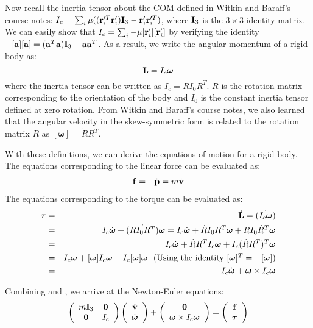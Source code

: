 Now recall the inertia tensor about the COM defined in Witkin and
Baraff's course notes: $I_c = \sum_i \mathbf{\mu} ((\mathbf{r}_i'^T
\mathbf{r}_i')\mathbf{I}_3 - \mathbf{r}_i' \mathbf{r}_i'^T)$, where $\mathbf{I}_3$ is the $3\times 3$
identity matrix. We can easily show that
$I_c = \sum_i -\mathbf{\mu} [\mathbf{r}_i'][\mathbf{r}_i']$ by verifying the
identity $-[\mathbf{a}][\mathbf{a}] = (\mathbf{a}^T\mathbf{a}) \mathbf{I}_3  -
\mathbf{a}\mathbf{a}^T$. As a result, we write the angular momentum of a rigid body as:
\begin{equation}
\mathbf{L} = I_c \bm{\omega}
\end{equation}
where the inertia tensor can be written as $I_c = RI_0R^T$. $R$ is the rotation matrix corresponding to the orientation of the body and $I_0$ is the constant inertia tensor defined at zero rotation. From Witkin and Baraff's course notes, we also learned that the angular velocity in the skew-symmetric form is related to the rotation matrix $R$ as $[\bm{\omega}] = \dot{R}R^T$.

With these definitions, we can derive the equations of motion for a
rigid body. The equations corresponding to the linear force can be evaluated as:
\begin{eqnarray}
\label{eq:force}
\mathbf{f} & = & \dot{\mathbf{p}} = m \dot{\mathbf{v}}
\end{eqnarray}
The equations corresponding to the torque can be evaluated as:
\begin{eqnarray}
\label{eq:torque}
\nonumber
\bm{\tau} & = & \dot{\mathbf{L}} = \dot{(I_c \bm{\omega})} \\
\nonumber
& = & I_c\dot{\bm{\omega}} + \dot{(RI_0 R^T)}\bm{\omega} = I_c\dot{\bm{\omega}} + \dot{R}I_0 R^T\bm{\omega} + R I_0 \dot{R}^T\bm{\omega}\\
\nonumber
& = & I_c\dot{\bm{\omega}} + \dot{R}R^T I_c \bm{\omega} + I_c
(\dot{R}R^T)^T\bm{\omega} \\ \nonumber
& = & I_c\dot{\bm{\omega}} + [\bm{\omega}]I_c \bm{\omega} -
I_c[\bm{\omega}]\bm{\omega}  \mbox{\ \ (Using the identity $[\bm{\omega}]^T = -[\bm{\omega}]$)}\\ 
&= & I_c\dot{\bm{\omega}} + \bm{\omega} \times I_c \bm{\omega}
\end{eqnarray}

Combining  and , we arrive at the
Newton-Euler equations:
\begin{equation}
\label{eq:newtoneuler}
\left(
\begin{array}{cc}
m\mathbf{I}_3 & \mathbf{0} \\
\mathbf{0} & I_c 
\end{array}
\right)
\left(
\begin{array}{c}
\dot{\mathbf{v}} \\
\dot{\bm{\omega}} 
\end{array}
\right) +
\left(
\begin{array}{c}
\mathbf{0}  \\
\bm{\omega} \times I_c \bm{\omega} 
\end{array}
\right) = 
\left(
\begin{array}{c}
\mathbf{f} \\
\bm{\tau} 
\end{array}
\right)
\end{equation}

